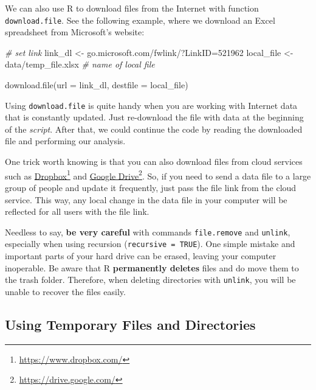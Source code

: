 \documentclass[
  12pt,
]{book}
\newenvironment{Shaded}{\begin{snugshade}}{\end{snugshade}}
\newcommand{\AttributeTok}[1]{\textcolor[rgb]{0.61,0.61,0.61}{#1}}
\newcommand{\CommentTok}[1]{\textcolor[rgb]{0.37,0.37,0.37}{\textit{#1}}}
\newcommand{\FunctionTok}[1]{\textcolor[rgb]{0,0,0}{#1}}
\newcommand{\NormalTok}[1]{#1}
\newcommand{\OtherTok}[1]{\textcolor[rgb]{0.37,0.37,0.37}{#1}}
\newcommand{\StringTok}[1]{\textcolor[rgb]{0.5,0.5,0.5}{#1}}
\newenvironment{rmdcaution}
{\begin{cautionblock}
		
	} {\end{cautionblock}}
\begin{document}
We can also use R to download files from the Internet with function \texttt{download.file}. See the following example, where we download an Excel spreadsheet from Microsoft's website:

\begin{Shaded}
\begin{Highlighting}[]
\CommentTok{\# set link}
\NormalTok{link\_dl }\OtherTok{\textless{}{-}} \StringTok{\textquotesingle{}go.microsoft.com/fwlink/?LinkID=521962\textquotesingle{}}
\NormalTok{local\_file }\OtherTok{\textless{}{-}} \StringTok{\textquotesingle{}data/temp\_file.xlsx\textquotesingle{}} \CommentTok{\# name of local file}

\FunctionTok{download.file}\NormalTok{(}\AttributeTok{url =}\NormalTok{ link\_dl,}
              \AttributeTok{destfile =}\NormalTok{ local\_file)}
\end{Highlighting}
\end{Shaded}

Using \texttt{download.file} is quite handy when you are working with Internet data that is constantly updated. Just re-download the file with data at the beginning of the \emph{script}. After that, we could continue the code by reading the downloaded file and performing our analysis.

One trick worth knowing is that you can also download files from cloud services such as \href{https://www.dropbox.com/}{Dropbox}\footnote{\url{https://www.dropbox.com/}} and \href{https://drive.google.com/}{Google Drive}\footnote{\url{https://drive.google.com/}}. So, if you need to send a data file to a large group of people and update it frequently, just pass the file link from the cloud service. This way, any local change in the data file in your computer will be reflected for all users with the file link.

\begin{rmdcaution}
Needless to say, \textbf{be very careful} with commands
\texttt{file.remove} and \texttt{unlink}, especially when using
recursion (\texttt{recursive\ =\ TRUE}). One simple mistake and
important parts of your hard drive can be erased, leaving your computer
inoperable. Be aware that R \textbf{permanently deletes} files and do
move them to the trash folder. Therefore, when deleting directories with
\texttt{unlink}, you will be unable to recover the files easily.
\end{rmdcaution}

\hypertarget{using-temporary-files-and-directories}{%
\subsection{Using Temporary Files and Directories}\label{using-temporary-files-and-directories}}
\end{document}
